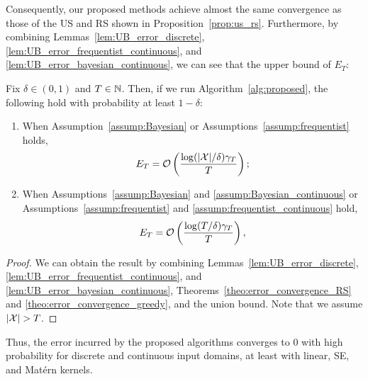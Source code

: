 Consequently, our proposed methods achieve almost the same convergence as those of the US and RS shown in Proposition~\ref{prop:us_rs}.
%
Furthermore, by combining Lemmas~\ref{lem:UB_error_discrete}, \ref{lem:UB_error_frequentist_continuous}, and \ref{lem:UB_error_bayesian_continuous}, we can see that the upper bound of $E_T$:
\begin{corollary}
    Fix $\delta \in (0, 1)$ and $T \in \mathbb{N}$.
    Then, if we run Algorithm~\ref{alg:proposed}, the following hold with probability at least $1 - \delta$:
    \begin{enumerate}
        \item When Assumption~\ref{assump:Bayesian} or Assumptions~\ref{assump:frequentist} holds, 
        \begin{align*}
            E_T = {\cal O}\left( \frac{\log (|{\cal X}| / \delta) \gamma_T}{T} \right);
        \end{align*}
        \item When Assumptions~\ref{assump:Bayesian} and \ref{assump:Bayesian_continuous} or Assumptions~\ref{assump:frequentist} and \ref{assump:frequentist_continuous} hold, 
        \begin{align*}
            E_T = {\cal O}\left( \frac{\log (T / \delta) \gamma_T}{T} \right),
        \end{align*}
    \end{enumerate}
\end{corollary}
\begin{proof}
    We can obtain the result by combining Lemmas~\ref{lem:UB_error_discrete}, \ref{lem:UB_error_frequentist_continuous}, and \ref{lem:UB_error_bayesian_continuous}, Theorems~\ref{theo:error_convergence_RS} and \ref{theo:error_convergence_greedy}, and the union bound.
    Note that we assume $|{\cal X}| > T$.
\end{proof}
%
Thus, the error incurred by the proposed algorithms converges to $0$ with high probability for discrete and continuous input domains, at least with linear, SE, and Mat\'ern kernels.

